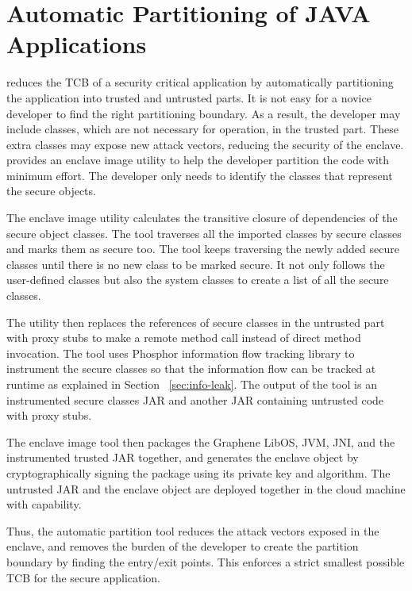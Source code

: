 \section{Automatic Partitioning of JAVA Applications}
\label{sec:partitioning}
\sysname{} reduces the TCB of a security critical 
application by automatically partitioning the 
application into trusted and untrusted parts. It is not 
easy for a novice developer to find the right 
partitioning boundary. As a result, the developer may 
include classes, which are not necessary for operation, 
in the trusted part. These extra classes may expose new 
attack vectors, reducing the security of the enclave. 
\sysname{} provides an enclave image utility to help 
the developer partition the code with minimum effort. 
The developer only needs to identify the classes that 
represent the secure objects.

The enclave image utility calculates the transitive 
closure of dependencies of the secure object classes.
The tool traverses all the imported classes by secure 
classes and marks them as secure too. The tool keeps 
traversing the newly added secure classes until there 
is no new class to be marked secure. It not only 
follows the user-defined classes but also the system 
classes to create a list of all the secure classes.

The utility then replaces the references of secure classes in the untrusted part with proxy stubs to make a remote method call instead of direct method invocation. The tool uses Phosphor information  flow tracking library to instrument the secure classes so that the information flow can be tracked at runtime as explained in Section ~\ref{sec:info-leak}. The output of the tool is an instrumented secure classes JAR and another JAR containing untrusted code with proxy stubs.

The enclave image tool then packages the Graphene LibOS, JVM, JNI, and the instrumented trusted JAR together, and generates the enclave object by cryptographically signing the package using its private key and  algorithm. The untrusted JAR and the enclave object are deployed together in the cloud machine with \sgx{} capability. 

Thus, the automatic partition tool reduces the attack vectors exposed in the enclave, and removes the burden of the developer to create the partition boundary by finding the entry/exit points. This enforces a strict smallest possible TCB for the secure application.
